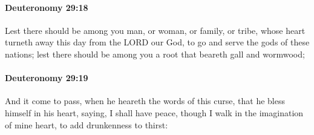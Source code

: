 		\paragraph{Deuteronomy 29:18} %
			\label{DEUTERONOMY-29-18}

			Lest there should be among you man, or woman, or family, or tribe, whose heart turneth away this day from the LORD our God, to go and serve the gods of these nations; lest there should be among you a root that beareth gall and wormwood;


		\paragraph{Deuteronomy 29:19} %
			\label{DEUTERONOMY-29-19}

			And it come to pass, when he heareth the words of this curse, that he bless himself in his heart, saying, I shall have peace, though I walk in the imagination of mine heart, to add drunkenness to thirst:


